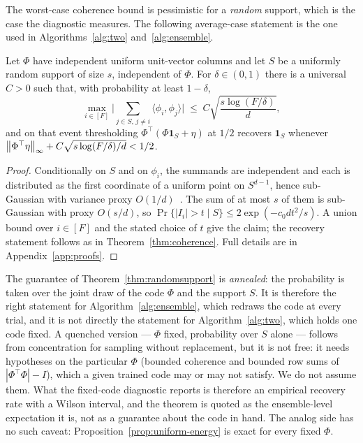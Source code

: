 The worst-case coherence bound is pessimistic for a \emph{random} support, which is the case
the diagnostic measures. The following average-case statement is the one used in
Algorithms~\ref{alg:two} and~\ref{alg:ensemble}.

\begin{theorem}
\label{thm:randomsupport}
Let $\Phi$ have independent uniform unit-vector columns and let $S$ be a uniformly random
support of size $s$, independent of $\Phi$. For $\delta\in(0,1)$ there is a universal $C>0$
such that, with probability at least $1-\delta$,
\[
  \max_{i\in[F]}\Big|\sum_{j\in S,\,j\neq i}\langle\phi_i,\phi_j\rangle\Big|
  \;\le\;C\sqrt{\frac{s\log(F/\delta)}{d}},
\]
and on that event thresholding $\Phi^{\top}(\Phi\mathbf 1_S+\eta)$ at $1/2$ recovers
$\mathbf 1_S$ whenever $\left\lVert \Phi^{\top}\eta \right\rVert_\infty+C\sqrt{s\log(F/\delta)/d}<1/2$.
\end{theorem}

\begin{proof}
Conditionally on $S$ and on $\phi_i$, the summands are independent and each is distributed as
the first coordinate of a uniform point on $S^{d-1}$, hence sub-Gaussian with variance proxy
$O(1/d)$~\cite[Thm.~3.4.6]{vershynin2018hdp}. The sum of at most $s$ of them is sub-Gaussian
with proxy $O(s/d)$, so $\Pr\{|I_i|>t\mid S\}\le2\exp(-c_0dt^2/s)$. A union bound over
$i\in[F]$ and the stated choice of $t$ give the claim; the recovery statement follows as in
Theorem~\ref{thm:coherence}. Full details are in Appendix~\ref{app:proofs}.
\end{proof}

\begin{remark}
\label{rem:annealed}
The guarantee of Theorem~\ref{thm:randomsupport} is \emph{annealed}: the probability is taken
over the joint draw of the code $\Phi$ and the support $S$. It is therefore the right statement
for Algorithm~\ref{alg:ensemble}, which redraws the code at every trial, and it is not directly
the statement for Algorithm~\ref{alg:two}, which holds one code fixed. A quenched version ---
$\Phi$ fixed, probability over $S$ alone --- follows from concentration for sampling without
replacement, but it is not free: it needs hypotheses on the particular $\Phi$ (bounded
coherence and bounded row sums of $|\Phi^{\top}\Phi|-I$), which a given trained code may or may
not satisfy. We do not assume them. What the fixed-code diagnostic reports is therefore an
empirical recovery rate with a Wilson interval, and the theorem is quoted as the ensemble-level
expectation it is, not as a guarantee about the code in hand. The analog side has no such
caveat: Proposition~\ref{prop:uniform-energy} is exact for every fixed $\Phi$.
\end{remark}

